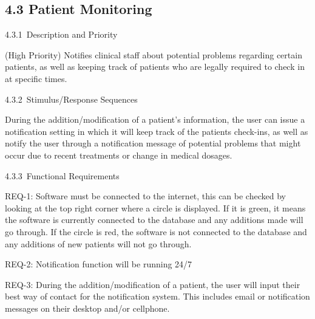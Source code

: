 \documentclass[12pt]{article}
\renewcommand{\_}{\kern-1.5pt\textunderscore\kern-1.5pt}
\begin{document}
\vspace{\baselineskip}
\setlength{\parskip}{3.96pt}
\subsection*{4.3 \hspace*{10pt}Patient Monitoring}
\setlength{\parskip}{12.0pt}
4.3.1\  \tab Description and Priority\par

(High Priority) Notifies clinical staff about potential problems regarding certain patients, as well as keeping track of patients who are legally required to check in at specific times.\par

4.3.2\  \tab Stimulus/Response Sequences\par

During the addition/modification of a patient's information, the user can issue a notification setting in which it will keep track of the patients check-ins, as well as notify the user through a notification message of potential problems that might occur due to recent treatments or change in medical dosages.\par

4.3.3\  \tab Functional Requirements\par

\begin{adjustwidth}{0.5in}{0.0in}
REQ-1: Software must be connected to the internet, this can be checked by looking at the top right corner where a circle is displayed. If it is green, it means the software is currently connected to the database and any additions made will go through. If the circle is red, the software is not connected to the database and any additions of new patients will not go through.\par

\end{adjustwidth}

\begin{adjustwidth}{0.5in}{0.0in}
REQ-2: Notification function will be running 24/7\par

\end{adjustwidth}

\begin{adjustwidth}{0.5in}{0.0in}
REQ-3: During the addition/modification of a patient, the user will input their best way of contact for the notification system. This includes email or notification messages on their desktop and/or cellphone.\par

\end{adjustwidth}
\end{document}
